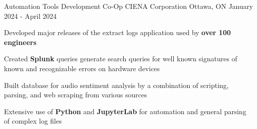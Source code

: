 

\begin{cventries}




	\cventry
	{Automation Tools Development Co-Op} %
	{CIENA Corporation} %
	{Ottawa, ON} %
	{January 2024 - April 2024} %
	{
		\begin{cvitems} %
      \item {Developed major releases of the extract logs application used by \textbf{over 100 engineers}}
			\item {Created \textbf{Splunk} queries generate search queries for well known signatures of known and recognizable errors on hardware devices}
      \item {Built database for audio sentiment analysis by a combination of scripting, parsing, and web scraping from various sources}
			\item {Extensive use of \textbf{Python} and \textbf{JupyterLab} for automation and general parsing of complex log files}
		\end{cvitems}
	}


\end{cventries}
